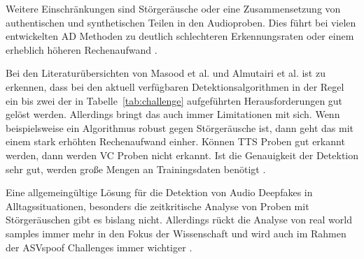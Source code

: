 Weitere Einschränkungen sind Störgeräusche oder eine Zusammensetzung von authentischen und synthetischen Teilen in den Audioproben.
Dies führt bei vielen entwickelten AD Methoden zu deutlich schlechteren Erkennungsraten oder einem erheblich höheren Rechenaufwand \citep[][]{Masood2022}.

Bei den Literaturübersichten von Masood et al. und Almutairi et al. ist zu erkennen, dass bei den aktuell verfügbaren Detektionsalgorithmen in der Regel ein bis zwei der in Tabelle~\ref{tab:challenge} aufgeführten Herausforderungen gut gelöst werden.
Allerdings bringt das auch immer Limitationen mit sich.
Wenn beispielsweise ein Algorithmus robust gegen Störgeräusche ist, dann geht das mit einem stark erhöhten Rechenaufwand einher.
Können TTS Proben gut erkannt werden, dann werden VC Proben nicht erkannt.
Ist die Genauigkeit der Detektion sehr gut, werden große Mengen an Trainingsdaten benötigt \citep[][]{Masood2022,Almutairi2022}.

Eine allgemeingültige Lösung für die Detektion von Audio Deepfakes in Alltagssituationen, besonders die zeitkritische Analyse von Proben mit Störgeräuschen gibt es bislang nicht.
Allerdings rückt die Analyse von \glqq{}real world samples\grqq{} immer mehr in den Fokus der Wissenschaft und wird auch im Rahmen der ASVspoof Challenges immer wichtiger \citep[][]{Yamagishi2021,Liu2022}.
